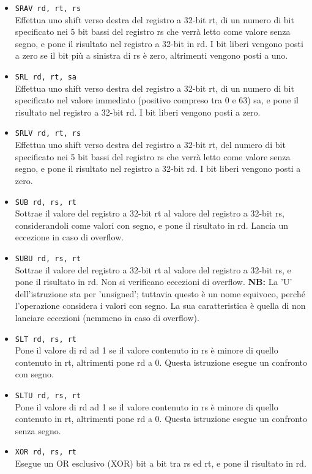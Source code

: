\documentclass[12pt]{report}
\newcommand{\MISN}{\textbf{NB:} La 'U' dell'istruzione sta per 'unsigned'; tuttavia questo \`{e} 
un nome equivoco, perch\'{e} l'operazione considera i valori con segno. La sua caratteristica \`{e} 
quella di non lanciare eccezioni (nemmeno in caso di overflow).}
\begin{document}
\begin{itemize}
	\item \texttt{SRAV rd, rt, rs}\\
	Effettua uno shift verso destra del registro a 32-bit rt, di un numero di bit specificato nei 5 bit bassi del registro rs che verr\`{a} letto come valore senza segno,
	e pone il risultato nel registro a 32-bit in rd. 
	I bit liberi vengono posti a zero se il bit pi\`{u} a sinistra di rs \`{e} zero, altrimenti vengono posti a uno.

	\item \texttt{SRL rd, rt, sa}\\
	Effettua uno shift verso destra del registro a 32-bit rt, di un numero di bit specificato nel valore immediato (positivo compreso tra 0 e 63) sa, 
	e pone il risultato nel registro a 32-bit rd. I bit liberi vengono posti a zero.
	
	\item \texttt{SRLV rd, rt, rs}\\
	Effettua uno shift verso destra del registro a 32-bit rt, del numero di bit specificato nei 5 bit bassi del registro rs che verr\`{a} letto come valore senza segno, 
	e pone il risultato nel registro a 32-bit rd. I bit liberi vengono posti a zero.

	\item \texttt{SUB rd, rs, rt}\\
	Sottrae il valore del registro a 32-bit rt al valore del registro a 32-bit rs, considerandoli come valori con segno,
	e pone il risultato in rd. Lancia un eccezione in caso di overflow.

	\item \texttt{SUBU rd, rs, rt}\\
	Sottrae il valore del registro a 32-bit rt al valore del registro a 32-bit rs, e pone il risultato in rd.
	Non si verificano eccezioni di overflow.
	\MISN{}

	\item \texttt{SLT rd, rs, rt}\\
	Pone il valore di rd ad 1 se il valore contenuto in rs \`{e} minore di quello contenuto in rt, 
	altrimenti pone rd a 0. Questa istruzione esegue un confronto con segno.

	\item \texttt{SLTU rd, rs, rt}\\
	Pone il valore di rd ad 1 se il valore contenuto in rs \`{e} minore di quello contenuto in rt, 
	altrimenti pone rd a 0. Questa istruzione esegue un confronto senza segno.

	\item \texttt{XOR rd, rs, rt}\\
	Esegue un OR esclusivo (XOR) bit a bit tra rs ed rt, e pone il risultato in rd.
\end{itemize}
\end{document}
